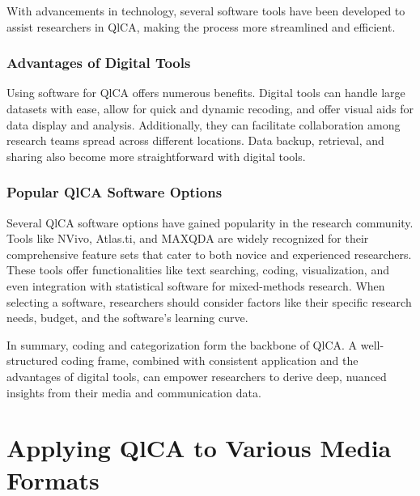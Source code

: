 \documentclass[
  b5paper]{book}
\begin{document}
With advancements in technology, several software tools have been developed to assist researchers in QlCA, making the process more streamlined and efficient.

\hypertarget{advantages-of-digital-tools}{%
\subsubsection*{Advantages of Digital Tools}\label{advantages-of-digital-tools}}

Using software for QlCA offers numerous benefits. Digital tools can handle large datasets with ease, allow for quick and dynamic recoding, and offer visual aids for data display and analysis. Additionally, they can facilitate collaboration among research teams spread across different locations. Data backup, retrieval, and sharing also become more straightforward with digital tools.

\hypertarget{popular-qlca-software-options}{%
\subsubsection*{Popular QlCA Software Options}\label{popular-qlca-software-options}}

Several QlCA software options have gained popularity in the research community. Tools like NVivo, Atlas.ti, and MAXQDA are widely recognized for their comprehensive feature sets that cater to both novice and experienced researchers. These tools offer functionalities like text searching, coding, visualization, and even integration with statistical software for mixed-methods research. When selecting a software, researchers should consider factors like their specific research needs, budget, and the software's learning curve.

In summary, coding and categorization form the backbone of QlCA. A well-structured coding frame, combined with consistent application and the advantages of digital tools, can empower researchers to derive deep, nuanced insights from their media and communication data.

\hypertarget{applying-qlca-to-various-media-formats}{%
\section{Applying QlCA to Various Media Formats}\label{applying-qlca-to-various-media-formats}}
\end{document}
